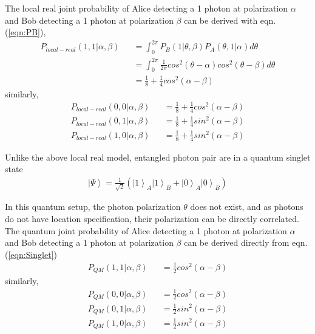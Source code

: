 \documentclass[prd,showpacs,twocolumn]{revtex4-1}
\begin{document}
The local real joint probability of Alice detecting a 1 photon at polarization $\alpha$ and Bob detecting a 1 photon at polarization $\beta$ can be derived with eqn. (\ref{eqn:PB}),
\begin{eqnarray}
P_{local-real}(1,1|\alpha,\beta)&&=\int_0^{2\pi} P_B(1|\theta,\beta)P_A(\theta,1|\alpha)d\theta\nonumber\\
&&=\int_0^{2\pi} \frac{1}{2\pi}cos^2(\theta-\alpha)cos^2(\theta-\beta)d\theta\nonumber\\
&&=\frac{1}{8}+ \frac{1}{4}cos^2(\alpha-\beta)
\label{eqn:PLocalReal}
\end{eqnarray}
similarly,
\begin{eqnarray}
P_{local-real}(0,0|\alpha,\beta)&&=\frac{1}{8}+ \frac{1}{4}cos^2(\alpha-\beta)\nonumber\\
P_{local-real}(0,1|\alpha,\beta)&&=\frac{1}{8}+ \frac{1}{4}sin^2(\alpha-\beta)\nonumber\\
P_{local-real}(1,0|\alpha,\beta)&&=\frac{1}{8}+ \frac{1}{4}sin^2(\alpha-\beta)
\label{eqn:PLocalReal1}
\end{eqnarray}

Unlike the above local real model, entangled photon pair are in a quantum singlet state
\begin{eqnarray}
\left| \Psi\right >=\frac{1}{\sqrt{2}}(\left| 1\right>_A\left| 1\right>_B+\left| 0\right>_A\left| 0\right>_B)
\label{eqn:Singlet}
\end{eqnarray}

In this quantum setup, the photon polarization $\theta$ does not exist, and as photons do not have location specification, their polarization can be directly correlated. The quantum joint probability of Alice detecting a 1 photon at polarization $\alpha$ and Bob detecting a 1 photon at polarization $\beta$ can be derived directly from eqn. (\ref{eqn:Singlet})
\begin{eqnarray}
P_{QM}(1,1|\alpha,\beta)&&=\frac{1}{2}cos^2(\alpha-\beta)
\label{eqn:PQM}
\end{eqnarray}
similarly,
\begin{eqnarray}
P_{QM}(0,0|\alpha,\beta)&&=\frac{1}{2}cos^2(\alpha-\beta)\nonumber\\
P_{QM}(0,1|\alpha,\beta)&&=\frac{1}{2}sin^2(\alpha-\beta)\nonumber\\
P_{QM}(1,0|\alpha,\beta)&&=\frac{1}{2}sin^2(\alpha-\beta)
\label{eqn:PQM1}
\end{eqnarray}
\end{document}
